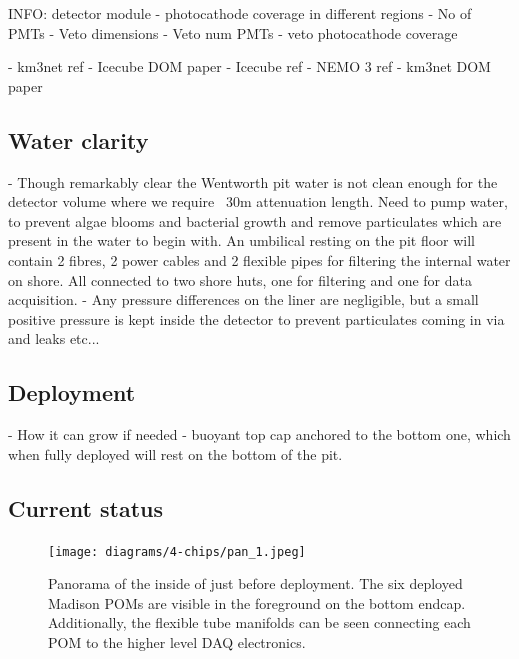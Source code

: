 INFO: detector module
- photocathode coverage in different regions
- No of PMTs
- Veto dimensions
- Veto num PMTs
- veto photocathode coverage

- km3net ref \cite{katz2009, adrian2016}
- Icecube DOM paper \cite{hanson2006}
- Icecube ref \cite{karle2003}
- NEMO 3 ref \cite{arnold2005}
- km3net DOM paper \cite{eijk2015}

\subsection{Water clarity} %
\label{sec:chips_detector_water} %

- Though remarkably clear the Wentworth pit water is not clean enough for the detector volume
where we require ~30m attenuation length. Need to pump water, to prevent algae blooms and
bacterial growth and remove particulates which are present in the water to begin with. An
umbilical resting on the pit floor will contain 2 fibres, 2 power cables and 2 flexible pipes for
filtering the internal water on shore. All connected to two shore huts, one for filtering and one
for data acquisition.
- Any pressure differences on the liner are negligible, but a small positive pressure is kept
inside the detector to prevent particulates coming in via and leaks etc...

\subsection{Deployment} %
\label{sec:chips_detector_deployment} %

- How it can grow if needed - buoyant top cap anchored to the bottom one, which when fully
deployed will rest on the bottom of the pit.

\subsection{Current status} %
\label{sec:chips_detector_status} %

\begin{figure} %
    \texttt{[image: diagrams/4-chips/pan\_1.jpeg]}
    \caption[Panorama of the inside of \chipsfive just before deployment.]
    {Panorama of the inside of \chipsfive just before deployment. The six deployed Madison POMs
        are visible in the foreground on the bottom endcap. Additionally, the flexible tube manifolds
        can be seen connecting each POM to the higher level DAQ electronics.}
    \label{fig:pan_1}
\end{figure}

